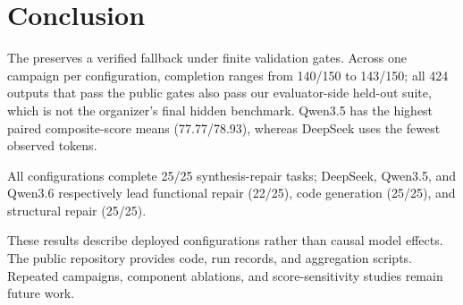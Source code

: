 \section{Conclusion}

The \VCL{} preserves a verified fallback under finite validation gates. Across
one campaign per configuration, completion ranges from 140/150 to 143/150; all
424 outputs that pass the public gates also pass our evaluator-side held-out
suite, which is not the organizer's final hidden benchmark. Qwen3.5 has the
highest paired composite-score means (77.77/78.93), whereas DeepSeek uses the
fewest observed tokens.

All configurations complete 25/25 synthesis-repair tasks; DeepSeek, Qwen3.5,
and Qwen3.6 respectively lead functional repair (22/25), code generation
(25/25), and structural repair (25/25).

These results describe deployed configurations rather than causal model
effects. The public repository provides code, run records, and aggregation
scripts. Repeated campaigns, component ablations, and score-sensitivity studies
remain future work.
